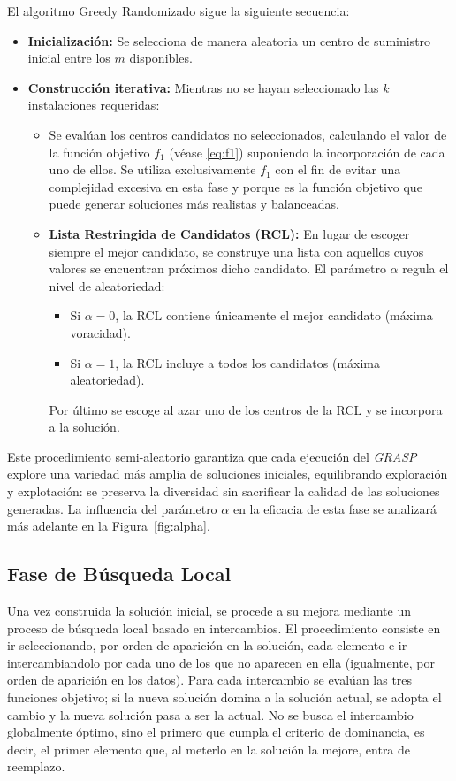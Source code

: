\documentclass[12pt,a4paper]{book}
\begin{document}
El algoritmo Greedy Randomizado sigue la siguiente secuencia:  

\begin{itemize}
    \item \textbf{Inicialización:} Se selecciona de manera aleatoria un centro de suministro inicial entre los $m$ disponibles.
    \item \textbf{Construcción iterativa:} Mientras no se hayan seleccionado las $k$ instalaciones requeridas:
    \begin{itemize}
        \item Se evalúan los centros candidatos no seleccionados, calculando el valor de la función objetivo $f_1$ (véase \ref{eq:f1}) suponiendo la incorporación de cada uno de ellos. Se utiliza exclusivamente $f_1$ con el fin de evitar una complejidad excesiva en esta fase y porque es la función objetivo que puede generar soluciones más realistas y balanceadas.
        \item \textbf{Lista Restringida de Candidatos (RCL):} En lugar de escoger siempre el mejor candidato, se construye una lista con aquellos cuyos valores se encuentran próximos dicho candidato. El parámetro $\alpha$ regula el nivel de aleatoriedad:
        \begin{itemize}
            \item Si $\alpha = 0$, la RCL contiene únicamente el mejor candidato (máxima voracidad).
            \item Si $\alpha = 1$, la RCL incluye a todos los candidatos (máxima aleatoriedad).
        \end{itemize}
        Por último se escoge al azar uno de los centros de la RCL y se incorpora a la solución.
    \end{itemize}
\end{itemize}

Este procedimiento semi-aleatorio garantiza que cada ejecución del \textit{GRASP} explore una variedad más amplia de soluciones iniciales, equilibrando exploración y explotación: se preserva la diversidad sin sacrificar la calidad de las soluciones generadas. La influencia del parámetro $\alpha$ en la eficacia de esta fase se analizará más adelante en la Figura~\ref{fig:alpha}.

\subsection{Fase de Búsqueda Local}
Una vez construida la solución inicial, se procede a su mejora mediante un proceso de búsqueda local basado en intercambios. El procedimiento consiste en ir seleccionando, por orden de aparición en la solución, cada elemento e ir intercambiandolo por cada uno de los que no aparecen en ella (igualmente, por orden de aparición en los datos). Para cada intercambio se evalúan las tres funciones objetivo; si la nueva solución domina a la solución actual, se adopta el cambio y la nueva solución pasa a ser la actual. No se busca el intercambio globalmente óptimo, sino el primero que cumpla el criterio de dominancia, es decir, el primer elemento que, al meterlo en la solución la mejore, entra de reemplazo. 
\end{document}
